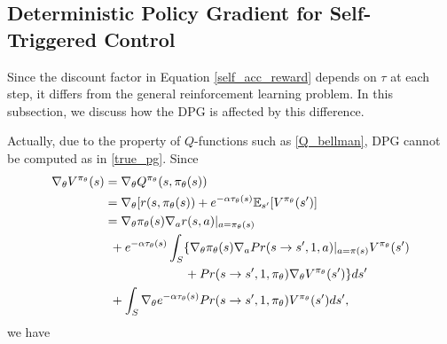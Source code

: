 \documentclass[english, dvipdfmx]{ampmt}             %
\newcommand{\expect}{\mathbb{E}}
\begin{document}
\subsection{Deterministic Policy Gradient for Self-Triggered Control}
Since the discount factor in Equation \eqref{self_acc_reward} depends on $\tau$ at each step, it differs from the general reinforcement learning problem. In this subsection, we discuss how the DPG is affected by this difference. \par
Actually, due to the property of $Q$-functions such as \eqref{Q_bellman}, DPG cannot be computed as in \eqref{true_pg}. Since 
\begin{align}
	\nabla_{\theta}V^{\pi_{\theta}}(s) &= \nabla_{\theta}Q^{\pi_{\theta}}(s, \pi_{\theta}(s)) \nonumber \\
	&= \nabla_{\theta}[r(s, \pi_{\theta}(s)) + e^{-\alpha\tau_{\theta}(s)}\expect_{s^{\prime}}[V^{\pi_{\theta}}(s^{\prime})] \nonumber \\
	&= \nabla_{\theta}\pi_{\theta}(s)\nabla_ar(s,a)|_{a=\pi_{\theta}(s)} \nonumber \\
	&\hspace{1ex}+e^{-\alpha\tau_{\theta}(s)}\int_{S}\{\nabla_{\theta}\pi_{\theta}(s)\nabla_aPr(s\to s^{\prime},1,a)|_{a=\pi(s)}V^{\pi_{\theta}}(s^{\prime})\nonumber\\
	&\hspace{15ex}+Pr(s\to s^{\prime}, 1, \pi_{\theta})\nabla_{\theta}V^{\pi_{\theta}}(s^{\prime})\}ds^{\prime}\nonumber \\
	&\hspace{1ex}+\int_{S}\nabla_{\theta}e^{-\alpha\tau_{\theta}(s)}Pr(s\to s^{\prime}, 1, \pi_{\theta})V^{\pi_{\theta}}(s^{\prime})ds^{\prime},
\end{align}
we have
\end{document}
